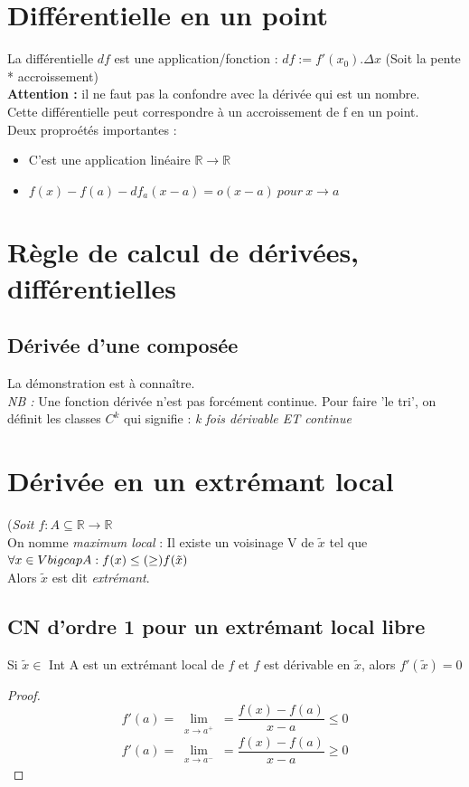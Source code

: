 \documentclass	[11pt, a4paper, openany]{book}
\begin{document}
\section{Différentielle en un point}
La différentielle $df$ est une application/fonction : $df := f'(x_{0}).\Delta x$ (Soit la pente * accroissement)\\
\textbf{Attention :} il ne faut pas la confondre avec la dérivée qui est un nombre.\\
Cette différentielle peut correspondre à un accroissement de f en un point. \\
Deux proproétés importantes :
\begin{itemize}
\item C'est une application linéaire $\mathbb{R} \rightarrow \mathbb{R}$
\item $f(x) - f(a) - df_{a}(x-a) = o(x-a)\ pour\ x \rightarrow a$
\end{itemize}

\section{Règle de calcul de dérivées, différentielles}
\subsection{Dérivée d'une composée}
La démonstration est à connaître.\\
\textit{NB : } Une fonction dérivée n'est pas forcément continue. Pour faire 'le tri', on définit les classes $C^{k}$ qui signifie : \textit{k fois dérivable ET continue}

\section{Dérivée en un extrémant local}
(\textit{Soit $ f : A \subseteq \mathbb{R} \rightarrow \mathbb{R}$}\\
On nomme \textit{maximum local} : Il existe un voisinage V de $\tilde{x}$ tel que $\forall x \in V \\bigcap A : f(x) \leq (\geq) f(\tilde{x})$\\
Alors $\tilde{x}$ est dit \textit{extrémant}.

\subsection{CN d'ordre 1 pour un extrémant local libre}
Si $\tilde{x} \in$ Int A est un extrémant local de $f$ et $f$ est dérivable en $\tilde{x}$, alors $f'(\tilde{x}) = 0$\\
\begin{proof}
$$f'(a) = \lim\limits_{\substack{x \to a^{+}}} = \frac{f(x) - f(a)}{x-a} \leq 0$$
$$f'(a) = \lim\limits_{\substack{x \to a^{-}}} = \frac{f(x) - f(a)}{x-a} \geq 0$$
\end{proof}
\end{document}
